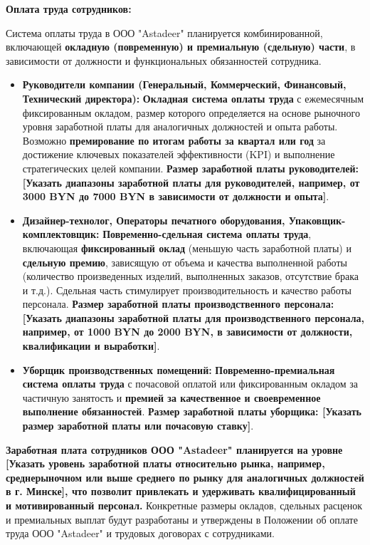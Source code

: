     \textbf{Оплата труда сотрудников:}

    Система оплаты труда в ООО "Astadeer" планируется комбинированной, включающей \textbf{окладную (повременную) и премиальную (сдельную) части}, в зависимости от должности и функциональных обязанностей сотрудника.

    \begin{itemize}
        \item \textbf{Руководители компании (Генеральный, Коммерческий, Финансовый, Технический директора):}  \textbf{Окладная система оплаты труда} с ежемесячным фиксированным окладом, размер которого определяется на основе рыночного уровня заработной платы для аналогичных должностей и опыта работы.  Возможно \textbf{премирование по итогам работы за квартал или год} за достижение ключевых показателей эффективности (KPI) и выполнение стратегических целей компании.  \textbf{Размер заработной платы руководителей: [Указать диапазоны заработной платы для руководителей, например, от 3000 BYN до 7000 BYN в зависимости от должности и опыта]}.
        \item \textbf{Дизайнер-технолог, Операторы печатного оборудования, Упаковщик-комплектовщик:}  \textbf{Повременно-сдельная система оплаты труда}, включающая \textbf{фиксированный оклад} (меньшую часть заработной платы) и \textbf{сдельную премию}, зависящую от объема и качества выполненной работы (количество произведенных изделий, выполненных заказов, отсутствие брака и т.д.).  Сдельная часть стимулирует производительность и качество работы персонала.  \textbf{Размер заработной платы производственного персонала: [Указать диапазоны заработной платы для производственного персонала, например, от 1000 BYN до 2000 BYN, в зависимости от должности, квалификации и выработки]}.
        \item \textbf{Уборщик производственных помещений:}  \textbf{Повременно-премиальная система оплаты труда} с почасовой оплатой или фиксированным окладом за частичную занятость и \textbf{премией за качественное и своевременное выполнение обязанностей}.  \textbf{Размер заработной платы уборщика: [Указать размер заработной платы или почасовую ставку]}.
    \end{itemize}

    \textbf{Заработная плата сотрудников ООО "Astadeer" планируется на уровне [Указать уровень заработной платы относительно рынка, например,  среднерыночном или выше среднего по рынку для аналогичных должностей в г. Минске], что позволит привлекать и удерживать квалифицированный и мотивированный персонал.}  Конкретные размеры окладов, сдельных расценок и премиальных выплат будут разработаны и утверждены в Положении об оплате труда ООО "Astadeer" и трудовых договорах с сотрудниками.

